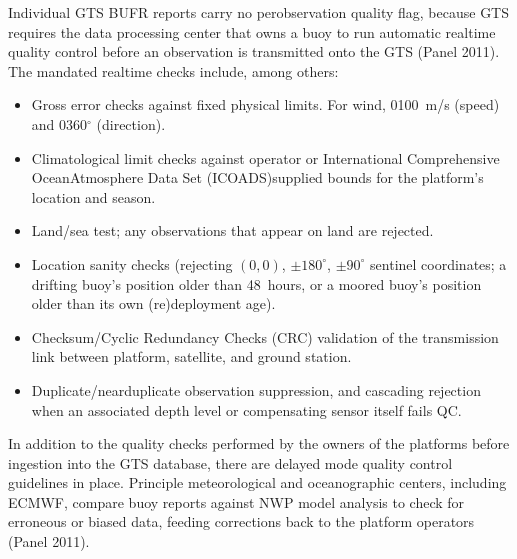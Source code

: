 \documentclass[a4paper,10pt,english]{sphinxmanual}
\begin{document}
\sphinxAtStartPar
Individual GTS BUFR reports carry no per\sphinxhyphen{}observation quality flag, because GTS requires the data processing center that owns a buoy to run automatic real\sphinxhyphen{}time quality control before an observation is transmitted onto the GTS (Panel 2011). The mandated real\sphinxhyphen{}time checks include, among others:
\begin{itemize}
\item {} 
\sphinxAtStartPar
Gross error checks against fixed physical limits. For wind, 0\textendash{}100 m/s (speed) and 0\textendash{}360\(^\circ\) (direction).

\item {} 
\sphinxAtStartPar
Climatological limit checks against operator\sphinxhyphen{} or International Comprehensive Ocean\sphinxhyphen{}Atmosphere Data Set (ICOADS)\sphinxhyphen{}supplied bounds for the platform’s location and season.

\item {} 
\sphinxAtStartPar
Land/sea test; any observations that appear on land are rejected.

\item {} 
\sphinxAtStartPar
Location sanity checks (rejecting \((0,0)\), \(\pm180^\circ\), \(\pm90^\circ\) sentinel coordinates; a drifting buoy’s position older than 48 hours, or a moored buoy’s position older than its own (re\sphinxhyphen{})deployment age).

\item {} 
\sphinxAtStartPar
Checksum/Cyclic Redundancy Checks (CRC) validation of the transmission link between platform, satellite, and ground station.

\item {} 
\sphinxAtStartPar
Duplicate/near\sphinxhyphen{}duplicate observation suppression, and cascading rejection when an associated depth level or compensating sensor itself fails QC.

\end{itemize}

\sphinxAtStartPar
In addition to the quality checks performed by the owners of the platforms before ingestion into the GTS database, there are delayed mode quality control guidelines in place. Principle meteorological and oceanographic centers, including ECMWF, compare buoy reports against NWP model analysis to check for erroneous or biased data, feeding corrections back to the platform operators (Panel 2011).

\sphinxAtStartPar
{}
\end{document}
